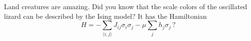 
Land creatures are amazing.
Did you know that the scale colors of the oscillated lizard can be described by the Ising model?
It has the Hamiltonian
\begin{equation}
  H =
  - \sum_{\langle i, j \rangle}J_{ij} \sigma_i \sigma_j
  - \mu \sum_j h_j \sigma_j \, ?
  \label{equation} %
\end{equation}
